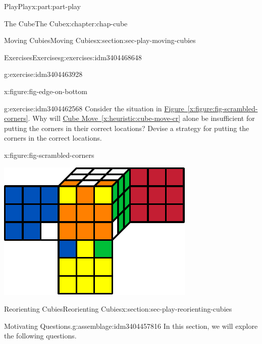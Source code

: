 \documentclass[oneside,10pt,]{book}
\newcommand{\xreffont}{\relax}
\numberwithin{equation}{section}
\begin{document}
\begin{partptx}{Play}{}{Play}{}{}{x:part:part-play}
\begin{chapterptx}{The Cube}{}{The Cube}{}{}{x:chapter:chap-cube}
\begin{sectionptx}{Moving Cubies}{}{Moving Cubies}{}{}{x:section:sec-play-moving-cubies}
\begin{exercises-subsection-numberless}{Exercises}{}{Exercises}{}{}{g:exercises:idm3404468648}
\begin{divisionexercise}{3}{}{}{g:exercise:idm3404463928}
\begin{figureptx}{}{x:figure:fig-edge-on-bottom}{}
\begin{image}{0.25}{0.5}{0.25}
\end{image}%
\tcblower
\end{figureptx}%
\end{divisionexercise}%
\begin{divisionexercise}{4}{}{}{g:exercise:idm3404462568}%
Consider the situation in \hyperref[x:figure:fig-scrambled-corners]{Figure~{\xreffont\ref{x:figure:fig-scrambled-corners}}}. Why will \hyperref[x:heuristic:cube-move-cr]{Cube Move~{\xreffont\ref{x:heuristic:cube-move-cr}}} alone be insufficient for putting the corners in their correct locations? Devise a strategy for putting the corners in the correct locations.%
\begin{figureptx}{}{x:figure:fig-scrambled-corners}{}%
\begin{image}{0.25}{0.5}{0.25}%
\includegraphics[width=\linewidth]{./images/scrambled_corners.pdf}
\end{image}%
\tcblower
\end{figureptx}%
\end{divisionexercise}%
\end{exercises-subsection-numberless}
\end{sectionptx}
%
%
\typeout{************************************************}
\typeout{************************************************}
%
\begin{sectionptx}{Reorienting Cubies}{}{Reorienting Cubies}{}{}{x:section:sec-play-reorienting-cubies}
\begin{assemblage}{Motivating Questions.}{g:assemblage:idm3404457816}%
In this section, we will explore the following questions. %
\begin{enumerate}

\end{enumerate}
\end{assemblage}
\end{sectionptx}
\end{chapterptx}
\end{partptx}
\end{document}
